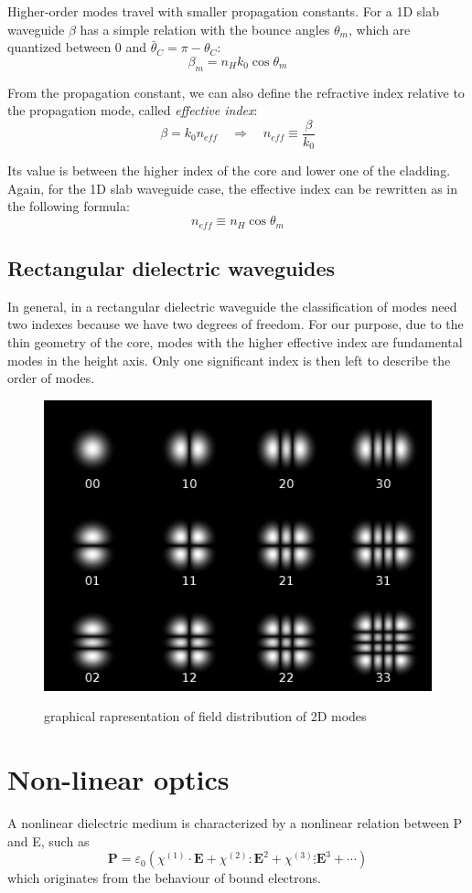 \documentclass[12pt,a4paper,twoside]{article}
\begin{document}
Higher-order modes travel with smaller propagation constants.
For a 1D slab waveguide $\beta$ has a simple relation with the bounce angles $\theta_m$, which are quantized between $0$ and $\bar{\theta}_C = \pi - \theta_C$:
$$\beta_m = n_H k_0 \cos \theta_m$$

From the propagation constant, we can also define the refractive index relative to the propagation mode, called \textit{effective index}:
\begin{equation}
\beta = k_0 n_{eff} \quad \Rightarrow \quad n_{eff} \equiv \frac{\beta}{k_0}
\end{equation}

Its value is between the higher index of the core and lower one of the cladding.
Again, for the 1D slab waveguide case, the effective index can be rewritten as in the following formula:
$$ n_{eff} \equiv n_H \cos \theta_m$$

\subsection{Rectangular dielectric waveguides}
In general, in a rectangular dielectric waveguide the classification of modes need two indexes because we have two degrees of freedom.
For our purpose, due to the thin geometry of the core, modes with the higher effective index are fundamental modes in the height axis.
Only one significant index is then left to describe the order of modes.

\begin{figure}[ht]
	\centering
	\includegraphics[width=.5\textwidth]{2Dmodes.png}
	\label{fig_2dmodes}
	\caption{graphical rapresentation of field distribution of 2D modes}
\end{figure}

\section{Non-linear optics}
A nonlinear dielectric medium is characterized by a nonlinear relation between P and E, such as
\begin{equation}
\textbf{P} = \varepsilon_0 \left( \chi^{(1)} \cdot \textbf{E} + \chi^{(2)} : \textbf{E}^2 + \chi^{(3)} \vdots \textbf{E}^3 + \cdots \right)
\end{equation}
which originates from the behaviour of bound electrons.
\end{document}
